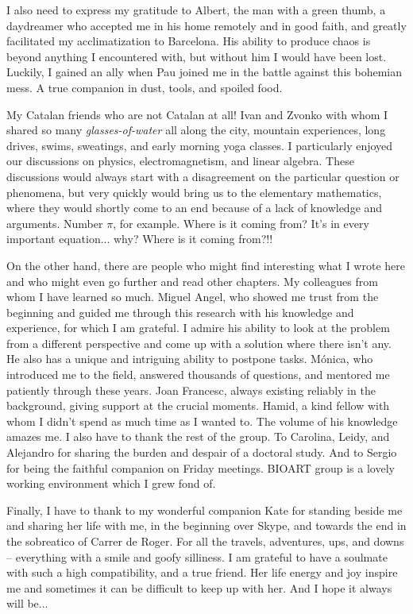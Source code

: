 \begin{acknowledgements}
I also need to express my gratitude to Albert, the man with a green thumb, a daydreamer who accepted me in his home remotely and in good faith, and greatly facilitated my acclimatization to Barcelona. His ability to produce chaos is beyond anything I encountered with, but without him I would have been lost. Luckily, I gained an ally when Pau joined me in the battle against this bohemian mess. A true companion in dust, tools, and spoiled food.

My Catalan friends who are not Catalan at all! Ivan and Zvonko with whom I shared so many \emph{glasses-of-water} all along the city, mountain experiences, long drives, swims, sweatings, and early morning yoga classes. I particularly enjoyed our discussions on physics, electromagnetism, and linear algebra. These discussions would always start with a disagreement on the particular question or phenomena, but very quickly would bring us to the elementary mathematics, where they would shortly come to an end because of a lack of knowledge and arguments. Number $\pi$, for example. Where is it coming from? It's in every important equation... why? Where is it coming from?!!

On the other hand, there are people who might find interesting what I wrote here and who might even go further and read other chapters. My colleagues from whom I have learned so much. Miguel Angel, who showed me trust from the beginning and guided me through this research with his knowledge and experience, for which I am grateful. I admire his ability to look at the problem from a different perspective and come up with a solution where there isn't any. He also has a unique and intriguing ability to postpone tasks. Mónica, who introduced me to the field, answered thousands of questions, and mentored me patiently through these years. Joan Francesc, always existing reliably in the background, giving support at the crucial moments. Hamid, a kind fellow with whom I didn't spend as much time as I wanted to. The volume of his knowledge amazes me. I also have to thank the rest of the group. To Carolina, Leidy, and Alejandro for sharing the burden and despair of a doctoral study. And to Sergio for being the faithful companion on Friday meetings. BIOART group is a lovely working environment which I grew fond of.

Finally, I have to thank to my wonderful companion Kate for standing beside me and sharing her life with me, in the beginning over Skype, and towards the end in the sobreatico of Carrer de Roger. For all the travels, adventures, ups, and downs -- everything with a smile and goofy silliness. I am grateful to have a soulmate with such a high compatibility, and a true friend. Her life energy and joy inspire me and sometimes it can be difficult to keep up with her. And I hope it always will be...


\end{acknowledgements}
